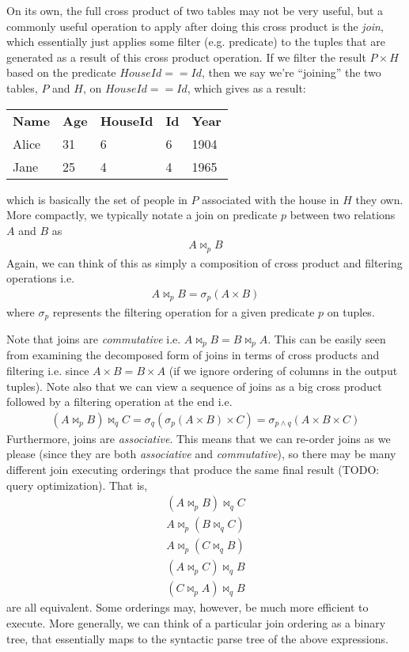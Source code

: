 \documentclass[10pt,a4paper]{article}
\begin{document}
On its own, the full cross product of two tables may not be very useful, but a commonly useful operation to apply after doing this cross product is the \textit{join}, which essentially just applies some filter (e.g. predicate) to the tuples that are generated as a result of this cross product operation. If we filter the result $P \times H$ based on the predicate $HouseId == Id$, then we say we're ``joining'' the two tables, $P$ and $H$, on $HouseId == Id$, which gives as a result:
\begin{center}
    \begin{tabular}{| l | l | l | l | l |}
        \textbf{Name} & \textbf{Age}& \textbf{HouseId} & \textbf{Id} & \textbf{Year} \\
        Alice & 31 & 6 & 6 & 1904\\  
        Jane & 25 & 4 & 4 & 1965   
\end{tabular}
\end{center}
which is basically the set of people in $P$ associated with the house in $H$ they own. More compactly, we typically notate a join on predicate $p$ between two relations $A$ and $B$ as
\begin{align*}
    A \Join_p B
\end{align*}
Again, we can think of this as simply a composition of cross product and filtering operations i.e.
\begin{align*}
    A \Join_p B = \sigma_p(A \times B)
\end{align*}
where $\sigma_p$ represents the filtering operation for a given predicate $p$ on tuples.

Note that joins are \textit{commutative} i.e. $A \Join_p B = B \Join_p A$. This can be easily seen from examining the decomposed form of joins in terms of cross products and filtering i.e. since $A \times B = B \times A$ (if we ignore ordering of columns in the output tuples). Note also that we can view a sequence of joins as a big cross product followed by a filtering operation at the end i.e.
\begin{align*}
    (A \Join_p B) \Join_q C = \sigma_q(\sigma_p(A \times B) \times C) = \sigma_{p \wedge q}(A \times B \times C)
\end{align*}
Furthermore, joins are \textit{associative}. This means that we can re-order joins as we please (since they are both \textit{associative} and \textit{commutative}), so there may be many different join executing orderings that produce the same final result (TODO: query optimization). That is,
\begin{align*}
    (A \Join_p B) \Join_q C \\ 
    A \Join_p (B \Join_q C) \\
    A \Join_p (C \Join_q B) \\
    (A \Join_p C) \Join_q B \\
    (C \Join_p A) \Join_q B
\end{align*}
are all equivalent. Some orderings may, however, be much more efficient to execute. More generally, we can think of a particular join ordering as a binary tree, that essentially maps to the syntactic parse tree of the above expressions. 
\end{document}

